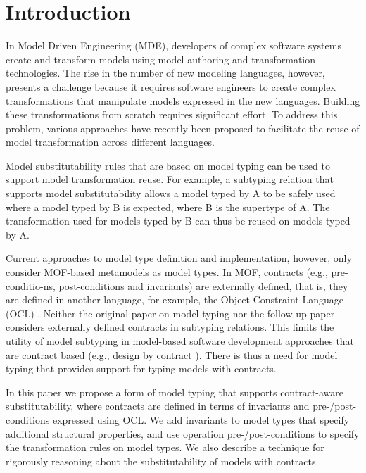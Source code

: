 \section{Introduction}

In Model Driven Engineering (MDE), developers of complex software systems create and transform models using model authoring and transformation technologies.
The rise in the number of new modeling languages, however, presents a challenge because it requires software engineers to create complex transformations that manipulate models expressed in the new languages. Building these transformations from scratch requires significant effort. To address this problem, various approaches \cite{Steel07}\cite{Varro04}\cite{Cuccuru07}\cite{Sanchez08}\cite{deLara10} have recently been proposed to facilitate the reuse of model transformation across different languages.  

Model substitutability rules that are based on model typing \cite{Steel07} can be used to support model transformation reuse.
For example, a subtyping relation that supports model substitutability allows a model typed by A to be safely used where a model typed by B is expected, where B is the supertype of A.
The transformation used for models typed by B can thus be reused on models typed by A.

Current approaches to model type definition and implementation, however, only consider MOF-based metamodels as model types. 
In MOF, contracts (e.g., pre-conditio-ns, post-conditions and invariants) are externally defined, that is, they are defined in another language, for example, the Object Constraint Language (OCL) \cite{OCL}. 
Neither the original paper on model typing \cite{Steel07} nor the follow-up paper \cite{ecmfa12} considers externally defined contracts in subtyping relations. This limits the utility of model subtyping in model-based software development approaches that  are contract based (e.g., design by contract \cite{meyer1992applying}).
There is thus a need for model typing that provides support for typing models with contracts.

In this paper we propose a form of model typing that supports contract-aware substitutability, where contracts are defined in terms of invariants and pre-/post-conditions expressed using OCL. 
We add invariants to model types that specify additional structural properties, and use operation pre-/post-conditions to specify the transformation rules on model types. 
We also describe a technique for rigorously reasoning about the substitutability of models with contracts.
 
